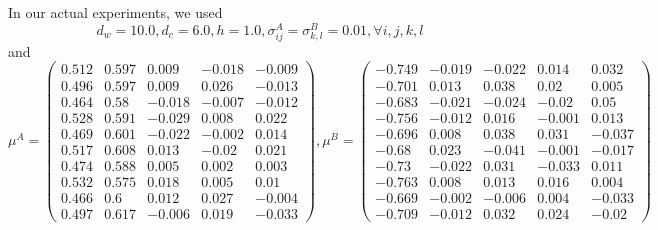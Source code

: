 \documentclass[english, aip, jcp, priprint, graphicx,floatfix]{revtex4-1}
\theoremstyle{plain}
\theoremstyle{definition}
\theoremstyle{plain}
\begin{document}
In our actual experiments, we used
\begin{equation*}
d_w = 10.0, 
d_c = 6.0,
h = 1.0,
\sigma^{A}_{i j} = \sigma^{B}_{k, l} = 0.01, \forall i, j, k, l
\end{equation*} and
\begin{equation*}
\mu^{A} = \begin{pmatrix}%
0.512&0.597&0.009&-0.018&-0.009\\%
0.496&0.597&0.009&0.026&-0.013\\%
0.464&0.58&-0.018&-0.007&-0.012\\%
0.528&0.591&-0.029&0.008&0.022\\%
0.469&0.601&-0.022&-0.002&0.014\\%
0.517&0.608&0.013&-0.02&0.021\\%
0.474&0.588&0.005&0.002&0.003\\%
0.532&0.575&0.018&0.005&0.01\\%
0.466&0.6&0.012&0.027&-0.004\\%
0.497&0.617&-0.006&0.019&-0.033%
\end{pmatrix}, 
\mu^{B} = \begin{pmatrix}%
-0.749&-0.019&-0.022&0.014&0.032\\%
-0.701&0.013&0.038&0.02&0.005\\%
-0.683&-0.021&-0.024&-0.02&0.05\\%
-0.756&-0.012&0.016&-0.001&0.013\\%
-0.696&0.008&0.038&0.031&-0.037\\%
-0.68&0.023&-0.041&-0.001&-0.017\\%
-0.73&-0.022&0.031&-0.033&0.011\\%
-0.763&0.008&0.013&0.016&0.004\\%
-0.669&-0.002&-0.006&0.004&-0.033\\%
-0.709&-0.012&0.032&0.024&-0.02%
\end{pmatrix}
\end{equation*}



\end{document}
